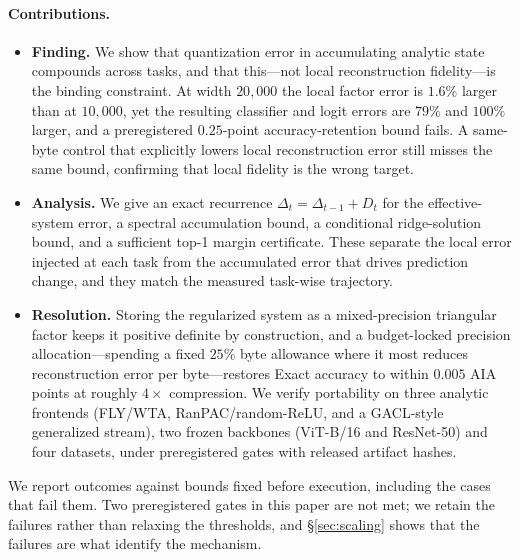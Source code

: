 \documentclass{article}
\begin{document}
\paragraph{Contributions.}
\begin{itemize}
\item[\textbf{C1}] \textbf{Finding.} We show that quantization error in
accumulating analytic state compounds across tasks, and that this---not local
reconstruction fidelity---is the binding constraint. At width $20{,}000$ the
local factor error is $1.6\%$ larger than at $10{,}000$, yet the resulting
classifier and logit errors are $79\%$ and $100\%$ larger, and a preregistered
$0.25$-point accuracy-retention bound fails. A same-byte control that
explicitly lowers local reconstruction error still misses the same bound,
confirming that local fidelity is the wrong target.

\item[\textbf{C2}] \textbf{Analysis.} We give an exact recurrence
$\Delta_t=\Delta_{t-1}+D_t$ for the effective-system error, a spectral
accumulation bound, a conditional ridge-solution bound, and a sufficient
top-1 margin certificate. These separate the local error injected at each task
from the accumulated error that drives prediction change, and they match the
measured task-wise trajectory.

\item[\textbf{C3}] \textbf{Resolution.} Storing the regularized system as a
mixed-precision triangular factor keeps it positive definite by construction,
and a budget-locked precision allocation---spending a fixed $25\%$ byte
allowance where it most reduces reconstruction error per byte---restores Exact
accuracy to within $0.005$ AIA points at roughly $4\times$ compression. We
verify portability on three analytic frontends (FLY/WTA, RanPAC/random-ReLU,
and a GACL-style generalized stream), two frozen backbones (ViT-B/16 and
ResNet-50) and four datasets, under preregistered gates with released artifact
hashes.
\end{itemize}

We report outcomes against bounds fixed before execution, including the cases
that fail them. Two preregistered gates in this paper are not met; we retain
the failures rather than relaxing the thresholds, and \S\ref{sec:scaling}
shows that the failures are what identify the mechanism.

\end{document}
